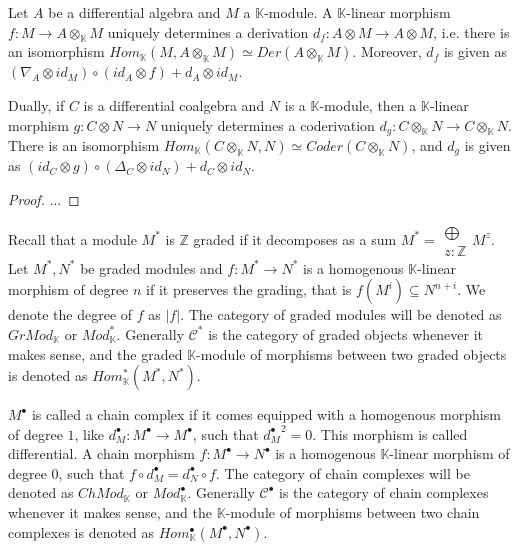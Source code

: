 \documentclass[../thesis.tex]{subfiles}
\begin{document}
            \begin{proposition}\label{prop: free-derivation}
                Let $A$ be a differential algebra and $M$ a $\mathbb{K}$-module. A $\mathbb{K}$-linear morphism $f:M\rightarrow A\otimes_{\mathbb{K}} M$ uniquely determines a derivation $d_f:A\otimes M\rightarrow A\otimes M$, i.e. there is an isomorphism $Hom_{\mathbb{K}}(M,A\otimes_{\mathbb{K}}M)\simeq Der(A\otimes_{\mathbb{K}}M)$. Moreover, $d_f$ is given as $(\nabla_A\otimes id_M)\circ (id_A\otimes f) + d_A\otimes id_M$.

                Dually, if $C$ is a differential coalgebra and $N$ is a $\mathbb{K}$-module, then a $\mathbb{K}$-linear morphism $g:C\otimes N\rightarrow N$ uniquely determines a coderivation $d_g:C\otimes_{\mathbb{K}}N\rightarrow C\otimes_{\mathbb{K}}N$. There is an isomorphism $Hom_{\mathbb{K}}(C\otimes_{\mathbb{K}}N,N)\simeq Coder(C\otimes_{\mathbb{K}}N)$, and $d_g$ is given as $(id_C\otimes g)\circ (\Delta_C\otimes id_N) + d_C\otimes id_N$.
            \end{proposition}

            \begin{proof}
                ...
            \end{proof}

            Recall that a module $M^*$ is $\mathbb{Z}$ graded if it decomposes as a sum $M^* = \substack{\bigoplus \\ z:\mathbb{Z}}M^z$. Let $M^*,N^*$ be graded modules and $f:M^*\rightarrow N^*$ is a homogenous $\mathbb{K}$-linear morphism of degree $n$ if it preserves the grading, that is $f(M^i) \subseteq N^{n+i}$. We denote the degree of $f$ as $|f|$. The category of graded modules will be denoted as $GrMod_{\mathbb{K}}$ or $Mod_\mathbb{K}^*$. Generally $\mathcal{C}^*$ is the category of graded objects whenever it makes sense, and the graded $\mathbb{K}$-module of morphisms between two graded objects is denoted as $Hom_{\mathbb{K}}^*(M^*,N^*)$.
            

            $M^{\bullet}$ is called a chain complex if it comes equipped with a homogenous morphism of degree $1$, like $d_M^{\bullet}:M^{\bullet}\rightarrow M^{\bullet}$, such that ${d_M^{\bullet}}^2=0$. This morphism is called differential. A chain morphism $f: M^{\bullet}\rightarrow N^{\bullet}$ is a homogenous $\mathbb{K}$-linear morphism of degree $0$, such that $f\circ d_M^{\bullet} = d_N^{\bullet}\circ f$. The category of chain complexes will be denoted as $ChMod_{\mathbb{K}}$ or $Mod_\mathbb{K}^\bullet$. Generally $\mathcal{C}^\bullet$ is the category of chain complexes whenever it makes sense, and the $\mathbb{K}$-module of morphisms between two chain complexes is denoted as $Hom_{\mathbb{K}}^{\bullet}(M^{\bullet},N^{\bullet})$.
\end{document}
